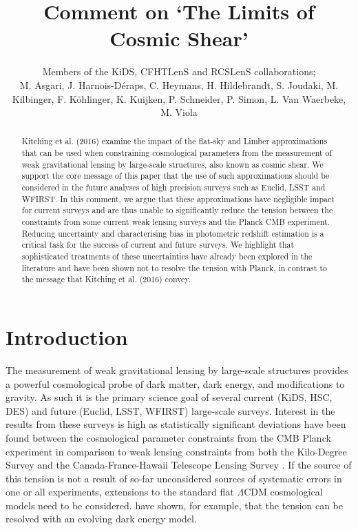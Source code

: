 \documentclass[a4paper, preprint, fleqn, usenatbib]{aastex}
\begin{document}
\title{\huge{Comment on `The Limits of Cosmic Shear'}}

\author{Members of the KiDS, CFHTLenS and RCSLenS collaborations; \\
M. Asgari, J. Harnois-D\'eraps, C. Heymans, H. Hildebrandt, S. Joudaki,  M. Kilbinger, F. K\"ohlinger, K. Kuijken, P. Schneider, P. Simon, L. Van Waerbeke, M. Viola}%


\begin{abstract}
Kitching et al. (2016) examine the impact of the flat-sky and Limber approximations that can be used when constraining cosmological parameters from the measurement of weak gravitational lensing by large-scale structures, also known as cosmic shear.  We support the core message of this paper that the use of such approximations should be considered in the future analyses of high precision surveys such as Euclid, LSST and WFIRST.  In this comment, we argue that these approximations have negligible impact for current surveys and are thus unable to significantly reduce the tension between the constraints from some current weak lensing surveys and the Planck CMB experiment.  Reducing uncertainty and characterising bias in photometric redshift estimation is a critical task for the success of current and future surveys.  We highlight that sophisticated treatments of these uncertainties have already been explored in the literature and have been shown not to resolve the tension with Planck, in contrast to the message that Kitching et al. (2016) convey.

\end{abstract}
\section{Introduction}

The measurement of weak gravitational lensing by large-scale structures provides a powerful cosmological probe of dark matter, dark energy, and modifications to gravity.  As such it is the primary science goal of several current (KiDS, HSC, DES) and future (Euclid, LSST, WFIRST) large-scale surveys. Interest in the results from these surveys is high as statistically significant deviations have been found between the cosmological parameter constraints from the CMB Planck experiment \citep{planck/cosmo:2015} in comparison to weak lensing constraints from both the Kilo-Degree Survey \citep[KiDS;][]{hildebrandt/etal:2016} and the Canada-France-Hawaii Telescope Lensing Survey \citep[CFHTLenS;][] {joudaki/etal:2016}.  If the source of this tension is not a result of so-far unconsidered sources of systematic errors in one or all experiments, extensions to the standard flat $\Lambda$CDM cosmological models need to be considered.  \citet{joudaki/etal:2017} have shown, for example, that the tension can be resolved with an evolving dark energy model.
\end{document}
